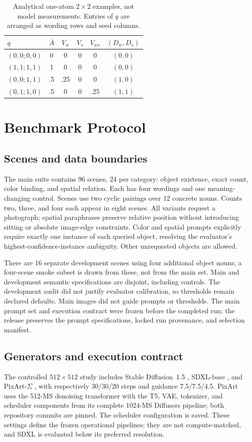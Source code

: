 \documentclass[10pt,letterpaper]{article}
\begin{document}
\begin{table}[t]
\centering\caption{Analytical one-atom $2\times2$ examples, not model measurements. Entries of $q$ are arranged as wording rows and seed columns.}
\begin{tabular}{@{}lccccc@{}}\toprule
$q$ & $\bar A$ & $V_w$ & $V_s$ & $V_{ws}$ & $(D_w,D_s)$\\\midrule
$(0,0;0,0)$ & 0 & 0 & 0 & 0 & $(0,0)$\\
$(1,1;1,1)$ & 1 & 0 & 0 & 0 & $(0,0)$\\
$(0,0;1,1)$ & .5 & .25 & 0 & 0 & $(1,0)$\\
$(0,1;1,0)$ & .5 & 0 & 0 & .25 & $(1,1)$\\\bottomrule
\end{tabular}\label{tab:analytical}
\end{table}

\section{Benchmark Protocol}
\subsection{Scenes and data boundaries}
The main suite contains 96 scenes, 24 per category: object existence, exact count, color binding, and spatial relation. Each has four wordings and one meaning-changing control. Scenes use two cyclic pairings over 12 concrete nouns. Counts two, three, and four each appear in eight scenes. All variants request a photograph; spatial paraphrases preserve relative position without introducing sitting or absolute image-edge constraints. Color and spatial prompts explicitly require exactly one instance of each queried object, resolving the evaluator's highest-confidence-instance ambiguity. Other unrequested objects are allowed.

There are 16 separate development scenes using four additional object nouns; a four-scene smoke subset is drawn from these, not from the main set. Main and development semantic specifications are disjoint, including controls. The development audit did not justify evaluator calibration, so thresholds remain declared defaults. Main images did not guide prompts or thresholds. The main prompt set and execution contract were frozen before the completed run; the release preserves the prompt specifications, locked run provenance, and selection manifest.

\subsection{Generators and execution contract}
The controlled $512\times512$ study includes Stable Diffusion~1.5 \cite{ldm}, SDXL-base \cite{sdxl}, and PixArt-$\Sigma$ \cite{pixart}, with respectively 30/30/20 steps and guidance 7.5/7.5/4.5. PixArt uses the 512-MS denoising transformer with the T5, VAE, tokenizer, and scheduler components from its complete 1024-MS Diffusers pipeline; both repository commits are pinned. The scheduler configuration is saved. These settings define the frozen operational pipelines; they are not compute-matched, and SDXL is evaluated below its preferred resolution.
\end{document}

